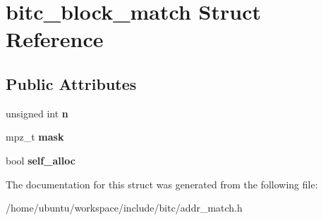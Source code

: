 \hypertarget{structbitc__block__match}{\section{bitc\-\_\-block\-\_\-match Struct Reference}
\label{structbitc__block__match}
}
\subsection*{Public Attributes}
\begin{DoxyCompactItemize}
\item 
\hypertarget{structbitc__block__match_ace0d5831a77014394534fe814797c436}{unsigned int {\bfseries n}}\label{structbitc__block__match_ace0d5831a77014394534fe814797c436}

\item 
\hypertarget{structbitc__block__match_aab640cb5792f9071db68589a76931b9d}{mpz\-\_\-t {\bfseries mask}}\label{structbitc__block__match_aab640cb5792f9071db68589a76931b9d}

\item 
\hypertarget{structbitc__block__match_aadd531e2eb3cbfb174a90c4f8c043672}{bool {\bfseries self\-\_\-alloc}}\label{structbitc__block__match_aadd531e2eb3cbfb174a90c4f8c043672}

\end{DoxyCompactItemize}


The documentation for this struct was generated from the following file\-:\begin{DoxyCompactItemize}
\item 
/home/ubuntu/workspace/include/bitc/addr\-\_\-match.\-h\end{DoxyCompactItemize}

